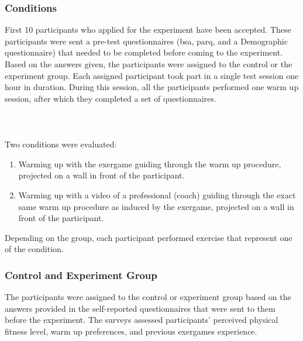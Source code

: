 \subsubsection{Conditions}
First 10 participants who applied for the experiment have been accepted. These participants were sent a pre-test questionnaires (\acrshort{bsa}, \acrshort{parq}, and a Demographic questionnaire) that needed to be completed before coming to the experiment. Based on the answers given, the participants were assigned to the control or the experiment group. Each assigned participant took part in a single test session one hour in duration. During this session, all the participants  performed one warm up session, after which they completed a set of questionnaires. \\\\\\\\Two conditions were evaluated:
\begin{enumerate}
\item Warming up with the exergame guiding through the warm up procedure, projected on a wall in front of the participant.
\item Warming up with a video of a professional (coach) guiding through the exact same warm up procedure as induced by the exergame, projected on a wall in front of the participant.
\end{enumerate}
Depending on the group, each participant performed exercise that represent one of the condition.
\subsubsection{Control and Experiment Group}
The participants were assigned to the control or experiment group based on the answers provided in the self-reported questionnaires that were sent to them before the experiment. The surveys assessed participants' perceived physical fitness level, warm up preferences, and previous exergames experience.
